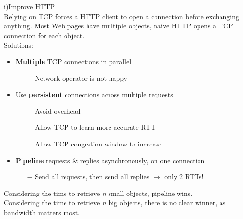 \documentclass[a4paper, fontsize=8pt, landscape, DIV=1]{scrartcl}
\begin{document}
\begin{multicols*}{4}
		i)Improve HTTP\\
		Relying on TCP forces a HTTP client to open a connection before exchanging anything. Most Web pages have multiple objects, naive HTTP opens a TCP connection for each object.\\
		Solutions:
		\begin{itemize}[noitemsep]
			\item \textbf{Multiple} TCP connections in parallel
			\begin{itemize}
				\item[$-$] Network operator is not happy
			\end{itemize}
			\item Use \textbf{persistent} connections across multiple requests
			\begin{itemize}
				\item[$-$] Avoid overhead
				\item[$-$] Allow TCP to learn more accurate RTT
				\item[$-$] Allow TCP congestion window to increase
			\end{itemize}
			\item \textbf{Pipeline} requests \& replies asynchronously, on one connection
			\begin{itemize}
				\item[$-$] Send all requests, then send all replies $\rightarrow$ only 2 RTTs!
			\end{itemize}
		\end{itemize}
		Considering the time to retrieve \textit{n} small objects, pipeline wins.\\
		Considering the time to retrieve \textit{n} big objects, there is no clear winner, as bandwidth matters most.\par 
		

\end{multicols*}
\end{document}
